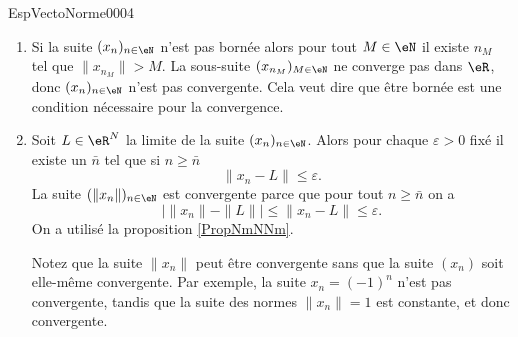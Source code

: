 \begin{corrige}{EspVectoNorme0004}
  \begin{enumerate}
  \item Si la suite $(x_n)_{n\in\eN}$ n'est pas bornée alors pour tout $M\in\eN$ il existe $n_M$ tel que $\|x_{n_M}\|>M$. La sous-suite $(x_{n_M})_{M\in\eN}$ ne converge pas dans $\eR$, donc $(x_n)_{n\in\eN}$ n'est pas convergente. Cela veut dire que être bornée est une condition nécessaire pour la convergence. 
    \item Soit $L\in\eR^N$ la limite de la suite $(x_n)_{n\in\eN}$. Alors pour chaque $\varepsilon >0$ fixé il existe un $\bar n$ tel que  si $n\geq \bar n$ 
      \begin{equation}
        \|x_n- L\|\leq \varepsilon.
      \end{equation}
      La suite $(\|x_n\|)_{n\in\eN}$ est convergente parce que pour tout $n\geq \bar n$ on a  
      \begin{equation}
        \left| \|x_{n}\|-\|L\|\right|\leq \|x_{n}-L\|\leq \varepsilon.
      \end{equation}
      On a utilisé la proposition \ref{PropNmNNm}.

      Notez que la suite $\| x_n \|$ peut être convergente sans que la suite $(x_n)$ soit elle-même convergente. Par exemple, la suite $x_n=(-1)^n$ n'est pas convergente, tandis que la suite des normes $\| x_n \|=1$ est constante, et donc convergente.
  \end{enumerate}
\end{corrige}
